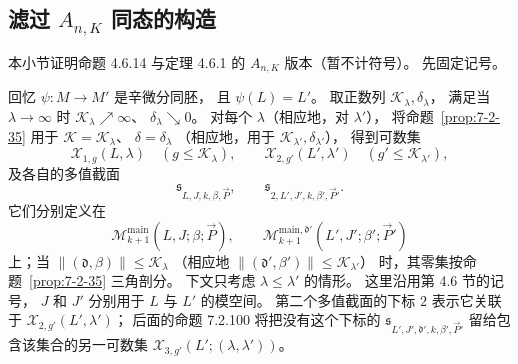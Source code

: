 
\subsection{滤过 $A_{n,K}$ 同态的构造}
\label{subsec:7-2-9}
%

本小节证明命题 4.6.14 与定理 4.6.1
的 $A_{n,K}$ 版本（暂不计符号）。
先固定记号。

回忆 $\psi\colon M\to M'$ 是辛微分同胚，
且 $\psi(L)=L'$。
取正数列 $\mathcal K_\lambda,\delta_\lambda$，
满足当 $\lambda\to\infty$ 时
$\mathcal K_\lambda\nearrow\infty$、
$\delta_\lambda\searrow0$。
对每个 $\lambda$（相应地，对 $\lambda'$），
将命题~\ref{prop:7-2-35}
用于 $\mathcal K=\mathcal K_\lambda$、
$\delta=\delta_\lambda$
（相应地，用于
$\mathcal K_{\lambda'},\delta_{\lambda'}$），
得到可数集
\[
\mathcal X_{1,g}(L,\lambda)
\quad(g\le\mathcal K_\lambda),
\qquad
\mathcal X_{2,g'}(L',\lambda')
\quad(g'\le\mathcal K_{\lambda'}),
\]
及各自的多值截面
\[
\mathfrak s_{L,J,k,\beta,\vec P},
\qquad
\mathfrak s_{2,L',J',k,\beta',\vec P'}.
\]
它们分别定义在
\[
\mathcal M^{\mathrm{main}}_{k+1}
(L,J;\beta;\vec P),
\qquad
\mathcal M^{\mathrm{main},\mathfrak d'}_{k+1}
(L',J';\beta';\vec P')
\]
上；当
$\|(\mathfrak d,\beta)\|\le\mathcal K_\lambda$
（相应地
$\|(\mathfrak d',\beta')\|\le\mathcal K_{\lambda'}$）
时，其零集按命题~\ref{prop:7-2-35}
三角剖分。
下文只考虑 $\lambda\le\lambda'$ 的情形。
这里沿用第 4.6 节的记号，
$J$ 和 $J'$ 分别用于 $L$ 与 $L'$ 的模空间。
第二个多值截面的下标 $2$ 表示它关联于
$\mathcal X_{2,g'}(L',\lambda')$；
后面的命题 7.2.100 将把没有这个下标的
$\mathfrak s_{L',J',\mathfrak d',k,\beta',\vec P'}$
留给包含该集合的另一可数集
$\mathcal X_{3,g'}(L';(\lambda,\lambda'))$。

